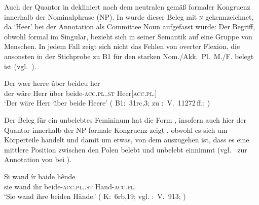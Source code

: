 \begin{exe}
\end{exe}

Auch der Quantor in  dekliniert nach dem neutralen
 gemäß formaler Kongruenz innerhalb der
Nominalphrase (NP). In  wurde dieser
Beleg mit \textsc{n\subA} gekennzeichnet, da  `Heer' bei der
Annotation als Committee Noun \autocite[211--213]{corbett2006}
aufgefasst wurde: Der Begriff, obwohl formal im Singular, bezieht sich in
seiner Semantik auf eine Gruppe von Menschen. In jedem Fall zeigt sich nicht
das Fehlen von overter Flexion, die ansonsten in der Stichprobe zu B1 für den
starken Nom./Akk.~Pl.~M./F. belegt ist (vgl.~).

\begin{exe}
\ex \label{ex:beideuher}
	\gll Der wær herre ûber beideu her \\
		der wäre Herr über beide-\textsc{acc.pl.\NeutA.st} Heer[\textsc{acc.pl.\NeutA}] \\
	\trans `Der wäre Herr über beide Heere'
		(%
			B1:~31rc,3; zu
			\KC:~V.~11272\,ff.;
			\cite[287]{schroeder1895}%
		)
\end{exe}

Der Beleg für ein unbelebtes Femininum hat die Form ,
insofern auch hier der Quantor innerhalb der NP formale
Kongruenz zeigt , obwohl es sich um
Körperteile handelt und damit um etwas, von dem auszugehen ist,
dass es eine mittlere Position zwischen den Polen belebt und
unbelebt einnimmt (vgl.~ zur
Annotation von  bei ).

\begin{exe}
	\ex \gll Si wand ír baide hênde \\
			sie wand ihr beide-\textsc{acc.pl.\FemI.st} Hand-\textsc{acc.pl.\FemI} \\
		\trans `Sie wand ihre beiden Hände.'
			(%
				K:~6rb,19; vgl.
				\KC:~V.~913;
				\cite[98]{schroeder1895}%
			)
		\label{ex:uozehende_2}
\end{exe}

